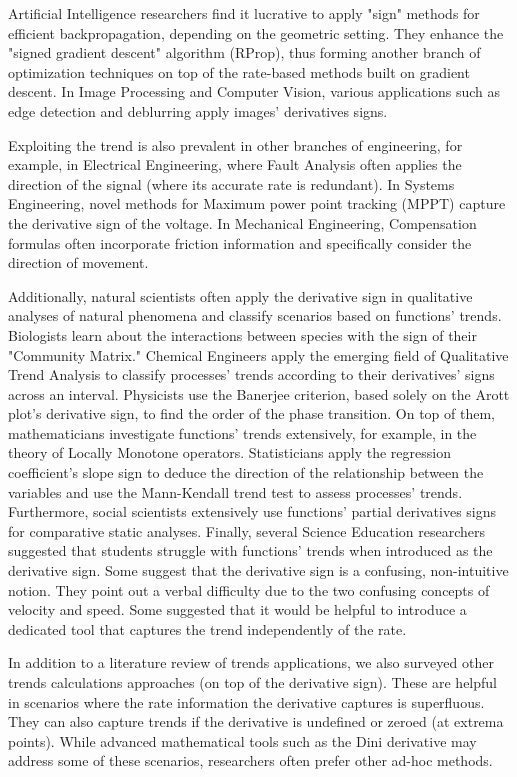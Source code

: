 \documentclass[11pt]{book}
\begin{document}
Artificial Intelligence researchers find it lucrative to apply "sign" methods for efficient backpropagation, depending on the geometric setting. They enhance the "signed gradient descent" algorithm (RProp), thus forming another branch of optimization techniques on top of the rate-based methods built on gradient descent. In Image Processing and Computer Vision, various applications such as edge detection and deblurring apply images' derivatives signs.

Exploiting the trend is also prevalent in other branches of engineering, for example, in Electrical Engineering, where Fault Analysis often applies the direction of the signal (where its accurate rate is redundant). In Systems Engineering, novel methods for Maximum power point tracking (MPPT) capture the derivative sign of the voltage. In Mechanical Engineering, Compensation formulas often incorporate friction information and specifically consider the direction of movement.

Additionally, natural scientists often apply the derivative sign in qualitative analyses of natural phenomena and classify scenarios based on functions' trends. Biologists learn about the interactions between species with the sign of their "Community Matrix." Chemical Engineers apply the emerging field of Qualitative Trend Analysis to classify processes' trends according to their derivatives' signs across an interval. Physicists use the Banerjee criterion, based solely on the Arott plot's derivative sign, to find the order of the phase transition. On top of them, mathematicians investigate functions' trends extensively, for example, in the theory of Locally Monotone operators. Statisticians apply the regression coefficient's slope sign to deduce the direction of the relationship between the variables and use the Mann-Kendall trend test to assess processes' trends.
Furthermore, social scientists extensively use functions' partial derivatives signs for comparative static analyses. Finally, several Science Education researchers suggested that students struggle with functions' trends when introduced as the derivative sign. Some suggest that the derivative sign is a confusing, non-intuitive notion. They point out a verbal difficulty due to the two confusing concepts of velocity and speed. Some suggested that it would be helpful to introduce a dedicated tool that captures the trend independently of the rate.

In addition to a literature review of trends applications, we also surveyed other trends calculations approaches (on top of the derivative sign). These are helpful in scenarios where the rate information the derivative captures is superfluous. They can also capture trends if the derivative is undefined or zeroed (at extrema points). While advanced mathematical tools such as the Dini derivative may address some of these scenarios, researchers often prefer other ad-hoc methods.
\end{document}
